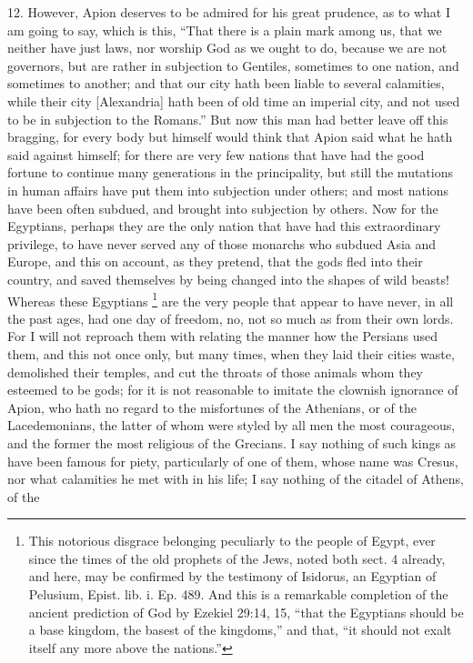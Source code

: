 12. However, Apion deserves to be admired for his great prudence, as to
what I am going to say, which is this, ``That there is a plain mark among
us, that we neither have just laws, nor worship God as we ought to do,
because we are not governors, but are rather in subjection to Gentiles,
sometimes to one nation, and sometimes to another; and that our city hath
been liable to several calamities, while their city [Alexandria] hath been
of old time an imperial city, and not used to be in subjection to the
Romans.'' But now this man had better leave off this bragging, for every
body but himself would think that Apion said what he hath said against
himself; for there are very few nations that have had the good fortune to
continue many generations in the principality, but still the mutations in
human affairs have put them into subjection under others; and most nations
have been often subdued, and brought into subjection by others. Now for
the Egyptians, perhaps they are the only nation that have had this
extraordinary privilege, to have never served any of those monarchs who
subdued Asia and Europe, and this on account, as they pretend, that the
gods fled into their country, and saved themselves by being changed into
the shapes of wild beasts! Whereas these Egyptians \footnote{This notorious disgrace
belonging peculiarly to the people of Egypt, ever since the times of the
old prophets of the Jews, noted both sect. 4 already, and here, may be
confirmed by the testimony of Isidorus, an Egyptian of Pelusium, Epist.
lib. i. Ep. 489. And this is a remarkable completion of the ancient
prediction of God by Ezekiel 29:14, 15, ``that the Egyptians should be a
base kingdom, the basest of the kingdoms,'' and that, ``it should not exalt
itself any more above the nations.''} are the
very people that appear to have never, in all the past ages, had one day
of freedom, no, not so much as from their own lords. For I will not
reproach them with relating the manner how the Persians used them, and
this not once only, but many times, when they laid their cities waste,
demolished their temples, and cut the throats of those animals whom they
esteemed to be gods; for it is not reasonable to imitate the clownish
ignorance of Apion, who hath no regard to the misfortunes of the
Athenians, or of the Lacedemonians, the latter of whom were styled by all
men the most courageous, and the former the most religious of the
Grecians. I say nothing of such kings as have been famous for piety,
particularly of one of them, whose name was Cresus, nor what calamities he
met with in his life; I say nothing of the citadel of Athens, of the

